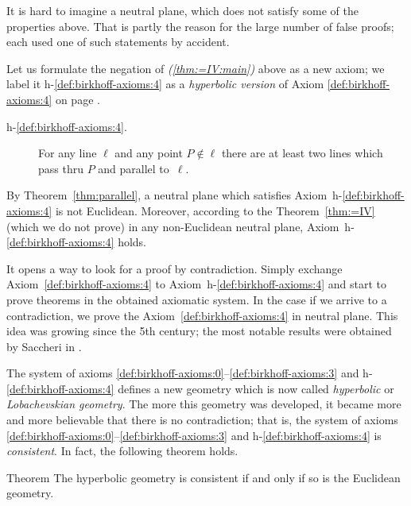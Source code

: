 It is hard to imagine a neutral plane, which does not satisfy some of the properties above.
That is partly the reason for the large number of false proofs;
each used one of such statements by accident.

Let us formulate the negation of \textit{(\ref{thm:=IV:main})} above as a new axiom;
we label it h-$\!$\ref{def:birkhoff-axioms:4} as a \emph{hyperbolic version} of Axiom \ref{def:birkhoff-axioms:4} on page \pageref{def:birkhoff-axioms:4}.


\begin{framed}
\begin{description}
\item[{\rm h-$\!$\ref{def:birkhoff-axioms:4}.}]\label{def:hyperbolic-4a}  
For any line $\ell$ and any point $P\notin\ell$ 
there are at least two lines which pass thru $P$ 
and parallel to~$\ell$.
\end{description}
\end{framed}

By Theorem~\ref{thm:parallel}, a neutral plane which satisfies Axiom~h-$\!$\ref{def:birkhoff-axioms:4} is not Euclidean. 
Moreover, according to the Theorem~\ref{thm:=IV} (which we do not prove) 
in any non-Euclidean neutral plane, Axiom~h-$\!$\ref{def:birkhoff-axioms:4} holds.

It opens a way to look for a proof by contradiction.
Simply exchange  Axiom~\ref{def:birkhoff-axioms:4} to Axiom~h-$\!$\ref{def:birkhoff-axioms:4}
 and start to prove theorems in the obtained axiomatic system.
In the case if we arrive to a contradiction, 
we prove the Axiom~\ref{def:birkhoff-axioms:4} in neutral plane.
This idea was growing since the 5th century;
the most notable results were obtained by Saccheri in \cite{saccheri}.

The system of axioms \ref{def:birkhoff-axioms:0}--\ref{def:birkhoff-axioms:3} and h-$\!$\ref{def:birkhoff-axioms:4} defines a new geometry which is now called \emph{hyperbolic} or  \emph{Lobachevskian geometry}.
The more this geometry was developed,
it became more and more believable that there is no contradiction;
that is, the system of axioms \ref{def:birkhoff-axioms:0}--\ref{def:birkhoff-axioms:3} and h-$\!$\ref{def:birkhoff-axioms:4} is \emph{consistent}.
In fact, the following theorem holds.


\begin{thm}{Theorem}\label{thm:consistent}
The hyperbolic geometry is consistent if and only if so is the Euclidean geometry.
\end{thm}

